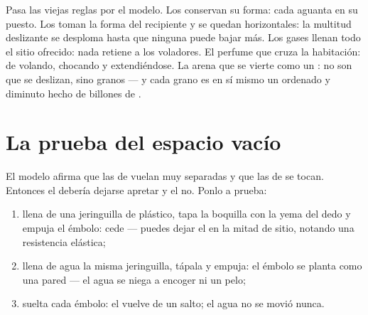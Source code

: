 \begin{example}\label{ex:g7:states-of-matter:rules}
Pasa las viejas reglas por el modelo. Los  conservan su
forma: cada  aguanta en su puesto. Los  toman
la forma del recipiente y se quedan horizontales: la multitud
deslizante se desploma hasta que ninguna  puede bajar más.
Los gases llenan todo el sitio ofrecido: nada retiene a los
voladores. El perfume que cruza la habitación:  de
 volando, chocando y extendiéndose. La arena que se vierte como
un : no son  que se deslizan, sino granos ---
y cada grano es en sí mismo un  ordenado y diminuto hecho de
billones de .
\end{example}

\section{La prueba del espacio vacío}

\begin{method}\label{met:g7:states-of-matter:syringe}
El modelo afirma que las  de  vuelan muy separadas y
que las de  se tocan. Entonces el  debería dejarse
apretar y el  no. Ponlo a prueba:
\begin{enumerate}
  \item llena de  una jeringuilla de plástico, tapa la boquilla
        con la yema del dedo y empuja el émbolo: cede --- puedes dejar
        el  en la mitad de sitio, notando una resistencia
        elástica;
  \item llena de agua la misma jeringuilla, tápala y empuja: el
        émbolo se planta como una pared --- el agua se niega a encoger
        ni un pelo;
  \item suelta cada émbolo: el  vuelve de un salto; el agua no
        se movió nunca.
\end{enumerate}
\end{method}

